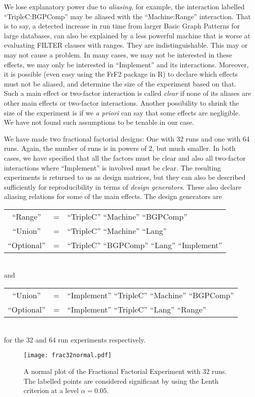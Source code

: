 \documentclass{llncs}
\begin{document}
We lose explanatory power due to \emph{aliasing}, for example, the
interaction labelled ``TripleC:BGPComp'' may be aliased with the
``Machine:Range'' interaction. That is to say, a detected increase in
run time from larger Basic Graph Patterns for large databases, can
also be explained by a less powerful machine that is worse at
evaluating FILTER clauses with ranges. They are
indistinguishable. This may or may not cause a problem. In many cases,
we may not be interested in these effects, we may only be interested
in ``Implement'' and its interactions. Moreover, it is possible (even
easy using the FrF2 package in R) to declare which effects must not be
aliased, and determine the size of the experiment based on that. Such
a main effect or two-factor interaction is called \emph{clear} if none
of its aliases are other main effects or two-factor
interactions. Another possibility to shrink the size of the experiment
is if we \textit{a priori} can say that some effects are
negligible. We have not found such assumptions to be tenable in our
case.

We have made two fractional factorial designs: One with 32 runs and
one with 64 runs. Again, the number of runs is in powers of 2, but
much smaller. In both cases, we have specified that all the factors
must be clear and also all two-factor interactions where ``Implement''
is involved must be clear. The resulting experiments is returned to us
as design matrices, but they can also be described sufficiently for
reproducibility in terms of \emph{design generators}. These also
declare aliasing relations for some of the main effects. The design
generators are\\
\begin{tabular}{ccl}
``Range'' &=& ``TripleC'' ``Machine'' ``BGPComp'' \\  
``Union'' &=& ``TripleC'' ``Machine'' ``Lang'' \\  
``Optional'' &=& ``TripleC'' ``BGPComp'' ``Lang'' ``Implement'' 
\end{tabular}
\\and\\
\begin{tabular}{ccl}
``Union'' &=& ``Implement''  ``TripleC''  ``Machine'' ``BGPComp'' \\
``Optional'' &=& ``Implement''  ``TripleC'' ``Lang''  ``Range'' 
\end{tabular}
\\for the 32 and 64 run experiments respectively.

\begin{figure}[h!]
  \centerline{%
    \texttt{[image: frac32normal.pdf]}}
  \caption{A normal plot of the Fractional Factorial Experiment with
    32 runs. The labelled points are considered significant by using
    the Lenth criterion at a level
    $\alpha=0.05$.}
  \label{fig:frac32normal}
\end{figure}
\end{document}
